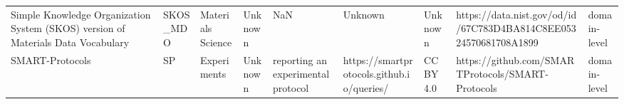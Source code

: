 \begin{tabular}{m{5cm}m{2cm}m{5cm}m{2cm}m{2cm}m{2cm}m{2cm}m{2cm}m{2cm}}
Simple Knowledge Organization System (SKOS) version of Materials Data Vocabulary  &                SKOS_MDO &                           Materials Science &                                                                                                                                                                                                                                                                                                                                                              Unknown &                                                                                                                                                                                                                                                                                                                                                                                                    NaN &                                                                                                            Unknown &                                      Unknown &                                   https://data.nist.gov/od/id/67C783D4BA814C8EE05324570681708A1899 &      domain-level \\
                                                                  SMART-Protocols &                      SP &                                 Experiments &                                                                                                                                                                                                                                                                                                                                                              Unknown &                                                                                                                                                                                                                                                                                                                                                                     reporting an experimental protocol &                                                                          https://smartprotocols.github.io/queries/ &                                    CC BY 4.0 &                                                  https://github.com/SMARTProtocols/SMART-Protocols &      domain-level \\

\end{tabular}
